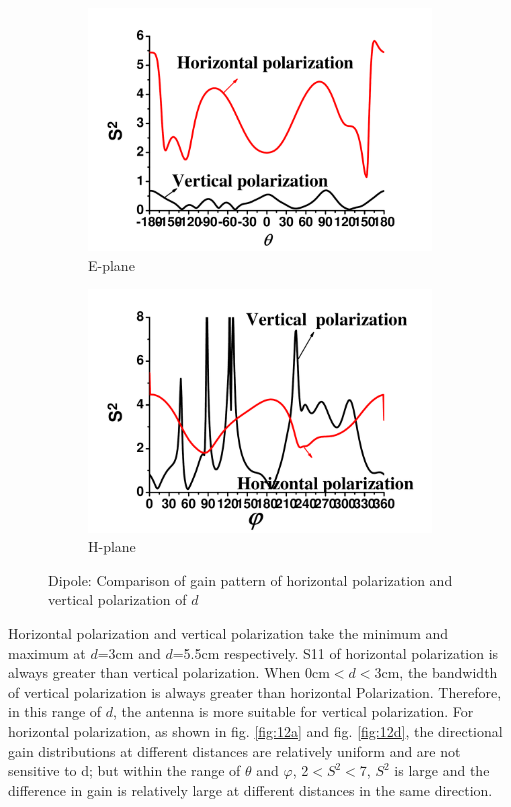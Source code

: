 \documentclass[journal]{IEEEtran}
\begin{document}
\begin{figure}[!htb]
\begin{subfigure}[b]{0.24\textwidth}
\includegraphics[width=\textwidth]{figs/12e.pdf}
\caption{E-plane}
\label{fig:12e}	
\end{subfigure}
\begin{subfigure}[b]{0.24\textwidth}
\includegraphics[width=\textwidth]{figs/12f.pdf}
\caption{H-plane}
\label{fig:12f}	
\end{subfigure}
\caption{Dipole: Comparison of gain pattern of horizontal polarization and vertical polarization of $d$}
\label{fig:12}
\end{figure}
Horizontal polarization and vertical polarization take the minimum and maximum at $d$=3cm and $d$=5.5cm respectively. S11 of horizontal polarization is always greater than vertical polarization. When 0cm$<$$d$$<$3cm, the bandwidth of vertical polarization is always greater than horizontal Polarization. Therefore, in this range of $d$, the antenna is more suitable for vertical polarization.
For horizontal polarization, as shown in fig. \ref{fig:12a} and fig. \ref{fig:12d}, the directional gain distributions at different distances are relatively uniform and are not sensitive to d; but within the range of $\theta$ and $\varphi$, 2$<$$S^{2}$$<$7, $S^{2}$ is large and the difference in gain is relatively large at different distances in the same direction.
\end{document}
